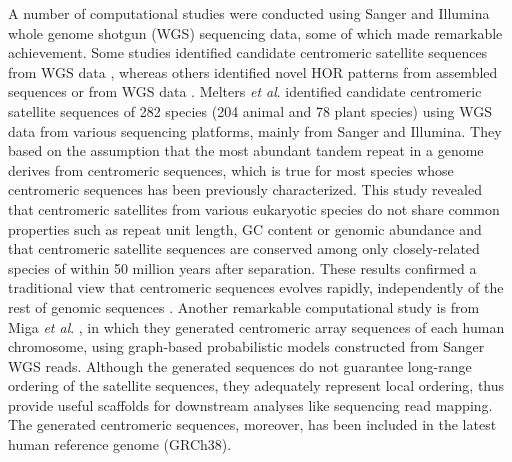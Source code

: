 A number of computational studies were conducted using Sanger and Illumina whole genome shotgun (WGS) sequencing data, some of which made remarkable achievement. Some studies identified candidate centromeric satellite sequences from WGS data \cite{Alkan2011, Melters2013}, whereas others identified novel HOR patterns from assembled sequences \cite{Rosandic2003} or from WGS data \cite{Alkan2007}.
Melters \textit{et al}. \cite{Melters2013} identified candidate centromeric satellite sequences of 282 species (204 animal and 78 plant species) using WGS data from various sequencing platforms, mainly from Sanger and Illumina. They based on the assumption that the most abundant tandem repeat in a genome derives from centromeric sequences, which is true for most species whose centromeric sequences has been previously characterized. This study revealed that centromeric satellites from various eukaryotic species do not share common properties such as repeat unit length, GC content or genomic abundance and that centromeric satellite sequences are conserved among only closely-related species of within 50 million years after separation. These results confirmed a traditional view that centromeric sequences evolves rapidly, independently of the rest of genomic sequences \cite{Henikoff2001}.
Another remarkable computational study is from Miga \textit{et al}. \cite{Miga2014}, in which they generated centromeric array sequences of each human chromosome, using graph-based probabilistic models constructed from Sanger WGS reads. Although the generated sequences do not guarantee long-range ordering of the satellite sequences, they adequately represent local ordering, thus provide useful scaffolds for downstream analyses like sequencing read mapping. The generated centromeric sequences, moreover, has been included in the latest human reference genome (GRCh38).

